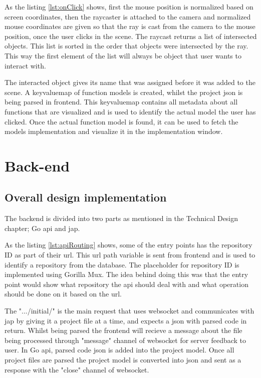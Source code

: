 As the listing \ref{lst:onClick} shows, first the mouse position is normalized based on screen coordinates, then the raycaster is attached to the camera and normalized mouse coordinates are given so that the ray is cast from the camera to the mouse position, once the user clicks in the scene. The \gls{raycast} returns a list of intersected objects. This list is sorted in the order that objects were intersected by the ray. This way the first element of the list will always be object that user wants to interact with.

The interacted object gives its name that was assigned before it was added to the scene. A \gls{keyvaluemap} of function models is created, whilst the project \gls{json} is being parsed in \gls{frontend}. This \gls{keyvaluemap} contains all metadata about all functions that are visualized and is used to identify the actual model the user has clicked. Once the actual function model is found, it can be used to fetch the models implementation and visualize it in the implementation window. 

\section{Back-end}

\subsection{Overall design implementation}

The \gls{backend} is divided into two parts as mentioned in the Technical Design chapter; Go \gls{api} and \gls{jap}.

As the listing \ref{lst:apiRouting} shows, some of the entry points has the repository ID as part of their \gls{url}. This \gls{url} path variable is sent from \gls{frontend} and is used to identify a repository from the database. The placeholder for repository ID is implemented using Gorilla Mux. The idea behind doing this was that the entry point would show what repository the \gls{api} should deal with and what operation should be done on it based on the \gls{url}.

The ".../initial/" is the main request that uses \gls{websocket} and communicates with \gls{jap} by giving it a project file at a time, and expects a \gls{json} with parsed code in return. Whilst being parsed the \gls{frontend} will recieve a message about the file being processed through "message" channel of \gls{websocket} for server feedback to user. In Go \gls{api}, parsed code \gls{json} is added into the project model. Once all project files are parsed the project model is converted into \gls{json} and sent as a response with the "close" channel of \gls{websocket}. 

